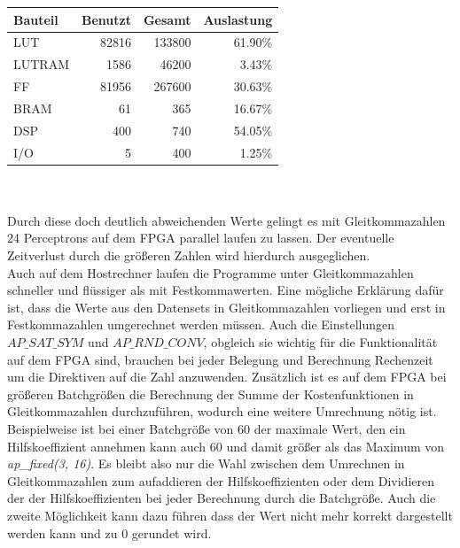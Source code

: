 \begin{tabularx}{.6\textwidth}{p{}|r|r|r}
Bauteil & Benutzt & Gesamt & Auslastung \\
\hline
LUT & 82816 & 133800 & 61.90\%\\
\hline
LUTRAM & 1586 & 46200 & 3.43\%\\
\hline
FF & 81956 & 267600 & 30.63\%\\
\hline
BRAM & 61 & 365 & 16.67\%\\
\hline
DSP & 400 & 740 & 54.05\%\\
\hline
I/O & 5 & 400 & 1.25\%\\
\end{tabularx}\\\\

Durch diese doch deutlich abweichenden Werte gelingt es mit Gleitkommazahlen 24 Perceptrons auf dem FPGA parallel laufen zu lassen.
Der eventuelle Zeitverlust durch die größeren Zahlen wird hierdurch ausgeglichen. \\ 
Auch auf dem Hostrechner laufen die Programme unter Gleitkommazahlen schneller und flüssiger als mit Festkommawerten. Eine mögliche Erklärung dafür ist, dass die Werte aus den Datensets in Gleitkommazahlen vorliegen und erst in Festkommazahlen umgerechnet werden müssen. Auch die Einstellungen $AP\_SAT\_SYM$ und $AP\_RND\_CONV$, obgleich sie wichtig für die Funktionalität auf dem FPGA sind, brauchen bei jeder Belegung und Berechnung Rechenzeit um die Direktiven auf die Zahl anzuwenden. Zusätzlich ist es auf dem FPGA bei größeren Batchgrößen die Berechnung der Summe der Kostenfunktionen in Gleitkommazahlen durchzuführen, wodurch eine weitere Umrechnung nötig ist. Beispielweise ist bei einer Batchgröße von 60 der maximale Wert, den ein Hilfskoeffizient annehmen kann auch 60 und damit größer als das Maximum von \textit{ap\_fixed(3, 16)}. Es bleibt also nur die Wahl zwischen dem Umrechnen in Gleitkommazahlen zum aufaddieren der Hilfskoeffizienten oder dem Dividieren der der Hilfskoeffizienten bei jeder Berechnung durch die Batchgröße. Auch die zweite Möglichkeit kann dazu führen dass der Wert nicht mehr korrekt dargestellt werden kann und zu 0 gerundet wird. 

